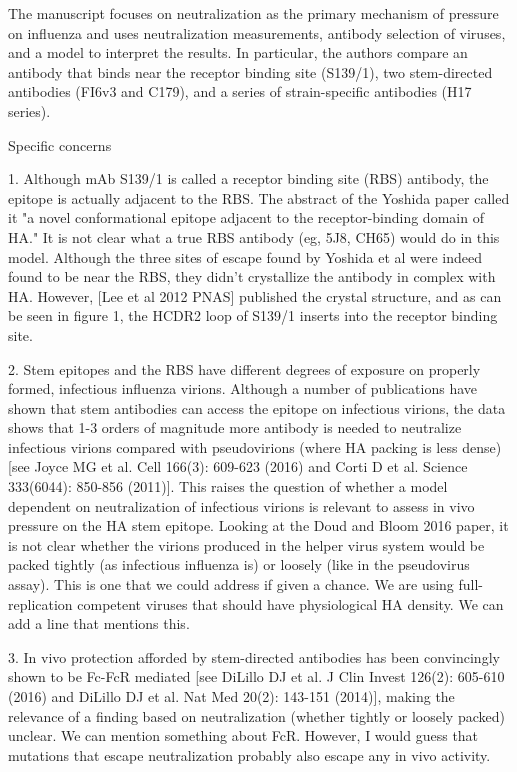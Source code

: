\documentclass[11pt, oneside]{article}   	%
\begin{document}
The manuscript focuses on neutralization as the primary mechanism of pressure on influenza and uses neutralization measurements, antibody selection of viruses, and a model to interpret the results. In particular, the authors compare an antibody that binds near the receptor binding site (S139/1), two stem-directed antibodies (FI6v3 and C179), and a series of strain-specific antibodies (H17 series).

Specific concerns

1. Although mAb S139/1 is called a receptor binding site (RBS) antibody, the epitope is actually adjacent to the RBS. The abstract of the Yoshida paper called it "a novel conformational epitope adjacent to the receptor-binding domain of HA." It is not clear what a true RBS antibody (eg, 5J8, CH65) would do in this model.
{\color{red} Although the three sites of escape found by Yoshida et al were indeed found to be near the RBS, they didn't crystallize the antibody in complex with HA. However, [Lee et al 2012 PNAS] published the crystal structure, and as can be seen in figure 1, the HCDR2 loop of S139/1 inserts into the receptor binding site.}

2. Stem epitopes and the RBS have different degrees of exposure on properly formed, infectious influenza virions. Although a number of publications have shown that stem antibodies can access the epitope on infectious virions, the data shows that 1-3 orders of magnitude more antibody is needed to neutralize infectious virions compared with pseudovirions (where HA packing is less dense) [see Joyce MG et al. Cell 166(3): 609-623 (2016) and Corti D et al. Science 333(6044): 850-856 (2011)]. This raises the question of whether a model dependent on neutralization of infectious virions is relevant to assess in vivo pressure on the HA stem epitope. Looking at the Doud and Bloom 2016 paper, it is not clear whether the virions produced in the helper virus system would be packed tightly (as infectious influenza is) or loosely (like in the pseudovirus assay).
{\color{red}
This is one that we could address if given a chance.
We are using full-replication competent viruses that should have physiological HA density. 
We can add a line that mentions this.
}

3. In vivo protection afforded by stem-directed antibodies has been convincingly shown to be Fc-FcR mediated [see DiLillo DJ et al. J Clin Invest 126(2): 605-610 (2016) and DiLillo DJ et al. Nat Med 20(2): 143-151 (2014)], making the relevance of a finding based on neutralization (whether tightly or loosely packed) unclear.
{\color{red}
We can mention something about FcR.
However, I would guess that mutations that escape neutralization probably also escape any in vivo activity.
}
\end{document}
